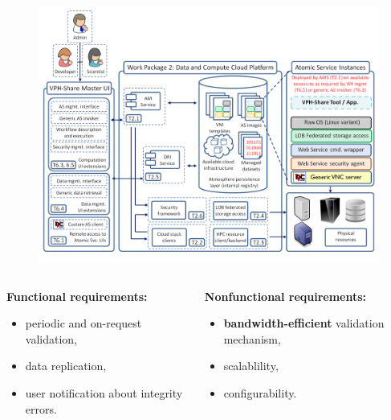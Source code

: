 \documentclass[compress]{beamer}
\begin{document}
\begin{frame}
\begin{figure}
	\centering
	\includegraphics[height=0.7\textheight]{img/cloud-platform.png}
\end{figure}
\begin{columns}
	\begin{column}{0.48\textwidth}
		\begin{block}{\small\textbf{Functional requirements:}}
		\tiny
			\begin{itemize}
				\item periodic and on-request validation,
				\item data replication,
				\item user notification about integrity errors.
			\end{itemize}
		\end{block}
	\end{column}
	\begin{column}{0.48\textwidth}
		\begin{block}{\small\textbf{Nonfunctional requirements:}}
		\tiny
			\begin{itemize}
				\item \textbf{bandwidth-efficient} validation mechanism,
				\item scalablility,
				\item configurability.
			\end{itemize}
		\end{block}
	\end{column}
\end{columns}
\end{frame}
\end{document}
